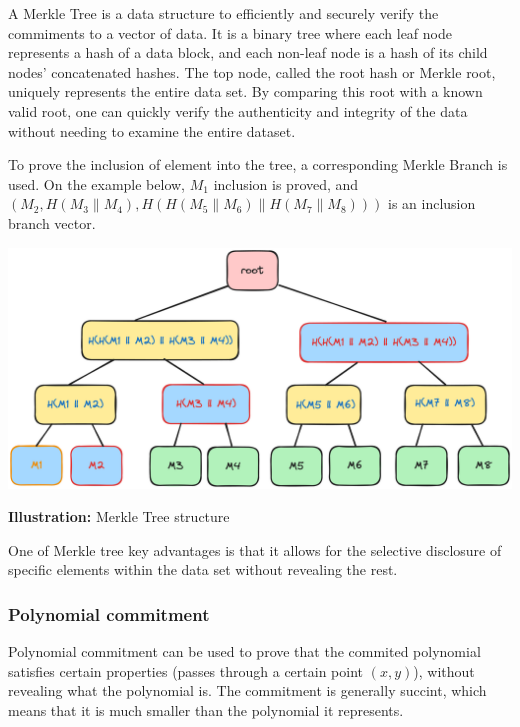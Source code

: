 \documentclass[../lecture-notes.tex]{subfiles}
\begin{document}
A Merkle Tree is a data structure to efficiently and securely verify the commiments to a vector of data. It is a binary tree where each leaf node represents a hash of a data block, and each non-leaf node is a hash of its child nodes' concatenated hashes. The top node, called the root hash or Merkle root, uniquely represents the entire data set. By comparing this root with a known valid root, one can quickly verify the authenticity and integrity of the data without needing to examine the entire dataset. 

To prove the inclusion of element into the tree, a corresponding Merkle Branch is used. On the example below, $M_1$ inclusion is proved, and 
$(M_2, H(M_3 \parallel M_4), H(H(M_5 \parallel M_6) \parallel H(M_7 \parallel M_8)))$ is an inclusion branch vector.

\begin{center}
    \centering\includegraphics[width=0.9\linewidth, clip]{images/lecture_5/MerkleTreeProof.png}

    \scriptsize{\textbf{Illustration:} Merkle Tree structure}
\end{center}

One of Merkle tree key advantages is that it allows for the selective disclosure of specific elements within the data set without revealing the rest. 

\subsubsection{Polynomial commitment}

Polynomial commitment can be used to prove that the commited polynomial satisfies certain properties (passes through a certain point $(x,y)$), without revealing what the polynomial is.
The commitment is generally succint, which means that it is much smaller than the polynomial it represents.

\vspace{0.5 cm}
\end{document}

